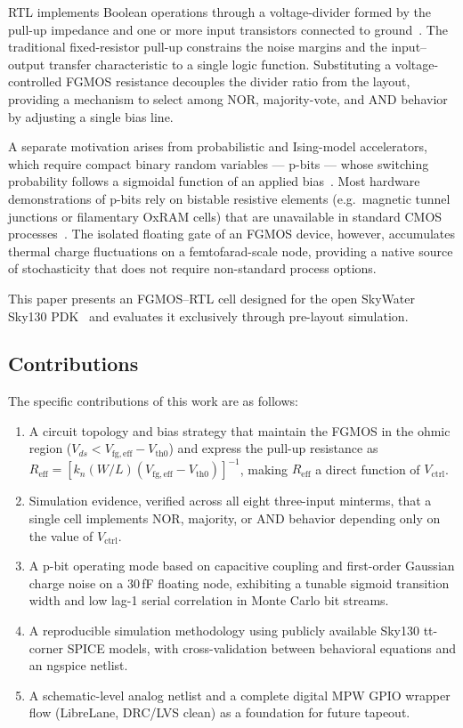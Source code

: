 \documentclass[a4paper,fleqn]{cas-sc}
\newcommand{\Vfgeff}{V_{\mathrm{fg,eff}}}
\newcommand{\Vctrl}{V_{\mathrm{ctrl}}}
\newcommand{\Reff}{R_{\mathrm{eff}}}
\newcommand{\Vth}{V_{\mathrm{th0}}}
\newcommand{\kn}{k_{n}}
\begin{document}
RTL implements Boolean operations through a voltage-divider formed by the pull-up
impedance and one or more input transistors connected to ground~\cite{Gray2009}.
The traditional fixed-resistor pull-up constrains the noise margins and the
input--output transfer characteristic to a single logic function. Substituting a
voltage-controlled FGMOS resistance decouples the divider ratio from the layout,
providing a mechanism to select among NOR, majority-vote, and AND behavior by adjusting
a single bias line.

A separate motivation arises from probabilistic and Ising-model accelerators, which
require compact binary random variables --- p-bits --- whose switching probability
follows a sigmoidal function of an applied bias~\cite{Camsari2019}. Most hardware
demonstrations of p-bits rely on bistable resistive elements (e.g.\ magnetic tunnel
junctions or filamentary OxRAM cells) that are unavailable in standard CMOS
processes~\cite{Kim2024}. The isolated floating gate of an FGMOS device, however,
accumulates thermal charge fluctuations on a femtofarad-scale node, providing a native
source of stochasticity that does not require non-standard process options.

This paper presents an FGMOS--RTL cell designed for the open SkyWater Sky130
PDK~\cite{SkyWater2020} and evaluates it exclusively through pre-layout simulation.

\subsection*{Contributions}

The specific contributions of this work are as follows:
\begin{enumerate}
  \item A circuit topology and bias strategy that maintain the FGMOS in the ohmic
        region ($V_{ds} < \Vfgeff - \Vth$) and express the pull-up resistance as
        $\Reff = [\kn(W/L)(\Vfgeff - \Vth)]^{-1}$, making $\Reff$ a direct
        function of $\Vctrl$.
  \item Simulation evidence, verified across all eight three-input minterms, that a
        single cell implements NOR, majority, or AND behavior depending only on
        the value of $\Vctrl$.
  \item A p-bit operating mode based on capacitive coupling and first-order Gaussian
        charge noise on a 30\,fF floating node, exhibiting a tunable sigmoid transition
        width and low lag-1 serial correlation in Monte Carlo bit streams.
  \item A reproducible simulation methodology using publicly available Sky130
        tt-corner SPICE models, with cross-validation between behavioral equations
        and an ngspice netlist.
  \item A schematic-level analog netlist and a complete digital MPW GPIO wrapper
        flow (LibreLane, DRC/LVS clean) as a foundation for future tapeout.
\end{enumerate}
\end{document}
